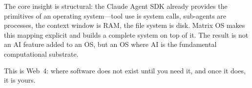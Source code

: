 \documentclass[11pt,a4paper]{article}
\begin{document}
The core insight is structural: the Claude Agent SDK already provides the primitives of an operating system---tool use is system calls, sub-agents are processes, the context window is RAM, the file system is disk. Matrix OS makes this mapping explicit and builds a complete system on top of it. The result is not an AI feature added to an OS, but an OS where AI is the fundamental computational substrate.

This is Web~4: where software does not exist until you need it, and once it does, it is yours.



\end{document}
